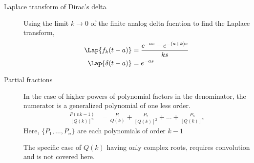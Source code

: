 \begin{description}
    \item[Laplace transform of Dirac's delta] Using the limit $ k \to 0 $ of the
        finite analog delta fucntion to find the Laplace transform,
        \begin{align}
            \Lap\{f_k(t-a)\}    & = \frac{e^{-as} - e^{-(a+k)s}}{ks} \\
            \Lap\{\delta(t-a)\} & = e^{-as}
        \end{align}
    \item[Partial fractions] In the case of higher powers of polynomial factors
        in the denominator, the numerator is a generalized polynomial of one less order.
        \begin{align}
            \frac{P(nk - 1)}{[Q(k)]^n} & = \frac{P_1}{Q(k)} + \frac{P_2}{[Q(k)]^2}
            + \dots + \frac{P_n}{[Q(k)]^n}
        \end{align}
        Here, $\{P_1, \dots, P_n\}$ are each polynomials of order $ k-1 $ \par
        The specific case of $ Q(k) $ having only complex roots, requires convolution and
        is not covered here.
\end{description}

